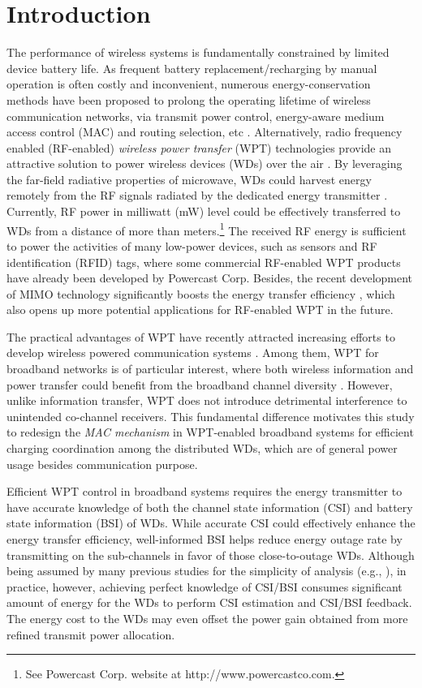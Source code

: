 \documentclass[conference]{IEEEtran}
\begin{document}
\section{Introduction}
The performance of wireless systems is fundamentally constrained by limited device battery life. As frequent battery replacement/recharging by manual operation is often costly and inconvenient, numerous energy-conservation methods have been proposed to prolong the operating lifetime of wireless communication networks, via transmit power control, energy-aware medium access control (MAC) and routing selection, etc \cite{2002:Biyikoglu,2004:Younis,2007:Chen}. Alternatively, radio frequency enabled (RF-enabled) \emph{wireless power transfer} (WPT) technologies provide an attractive solution to power wireless devices (WDs) over the air \cite{2014:Bi}. By leveraging the far-field radiative properties of microwave, WDs could harvest energy remotely from the RF signals radiated by the dedicated energy transmitter \cite{2013:Zhou}. Currently, RF power in milliwatt (mW) level could be effectively transferred to WDs from a distance of more than  meters.\footnote{See Powercast Corp. website at http://www.powercastco.com.} The received RF energy is sufficient to power the activities of many low-power devices, such as sensors and RF identification (RFID) tags, where some commercial RF-enabled WPT products have already been developed by Powercast Corp. Besides, the recent development of MIMO technology significantly boosts the energy transfer efficiency \cite{2013:Zhang,2014:Xu}, which also opens up more potential applications for RF-enabled WPT in the future.

The practical advantages of WPT have recently attracted increasing efforts to develop wireless powered communication systems \cite{2014:Bi,2013:Zhou,2013:Zhang,2014:Ju1,2014:Zhou,2013:Nintanavongsa,2014:Xu}. Among them, WPT for broadband networks is of particular interest, where both wireless information and power transfer could benefit from the broadband channel diversity \cite{2014:Zhou,2013:Nintanavongsa}. However, unlike information transfer, WPT does not introduce detrimental interference to unintended co-channel receivers. This fundamental difference motivates this study to redesign the \emph{MAC mechanism} in WPT-enabled broadband systems for efficient charging coordination among the distributed WDs, which are of general power usage besides communication purpose.

Efficient WPT control in broadband systems requires the energy transmitter to have accurate knowledge of both the channel state information (CSI) and battery state information (BSI) of WDs. While accurate CSI could effectively enhance the energy transfer efficiency, well-informed BSI helps reduce energy outage rate by transmitting on the sub-channels in favor of those close-to-outage WDs. Although being assumed by many previous studies for the simplicity of analysis (e.g., \cite{2014:Zhou,2013:Nintanavongsa}), in practice, however, achieving perfect knowledge of CSI/BSI consumes significant amount of energy for the WDs to perform CSI estimation and CSI/BSI feedback. The energy cost to the WDs may even offset the power gain obtained from more refined transmit power allocation.
\end{document}
